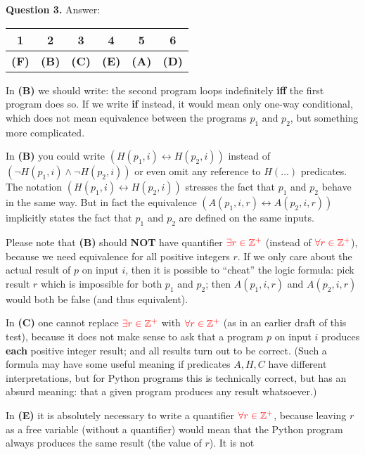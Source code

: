 \documentclass[jou]{apa6}
\begin{document}
\vspace{6pt}
{\bf Question 3.} Answer:\\
\begin{tabular}{|c|c|c|c|c|c|} \hline
1 & 2 & 3 & 4 & 5 & 6 \\ \hline
{\bf (F)} & {\bf (B)} & {\bf (C)} & {\bf (E)} & {\bf (A)} & {\bf (D)} \\ \hline
\end{tabular} 

\vspace{3pt}
In {\bf (B)} we should write: the second program loops indefinitely {\bf iff} 
the first program does so. If we write {\bf if} instead, it 
would mean only one-way conditional, which does not mean 
equivalence between the programs $p_1$ and $p_2$, but something more complicated.

In {\bf (B)} you could write $(H(p_1,i) \leftrightarrow H(p_2,i))$
instead of $(\neg H(p_1,i) \wedge \neg H(p_2,i))$ or 
even omit any reference to $H(\ldots)$ predicates. 
The notation $(H(p_1,i) \leftrightarrow H(p_2,i))$ stresses the fact that $p_1$ and $p_2$ behave in the same way. 
But in fact the equivalence $(A(p_1,i,r) \leftrightarrow A(p_2,i,r))$ implicitly 
states the fact that $p_1$ and $p_2$ are defined on the same inputs.

Please note that {\bf (B)} should {\bf NOT} have quantifier  
 $\textcolor{red}{\exists r \in \mathbb{Z}^{+}}$ 
(instead of  $\textcolor{red}{\forall r \in \mathbb{Z}^{+}}$), because we need
equivalence for all positive integers $r$. If we only care about the
actual result of $p$ on input $i$, then it is possible to ``cheat'' the logic formula: 
pick result $r$ which is impossible for both $p_1$ and $p_2$; then $A(p_1,i,r)$ 
and $A(p_2,i,r)$ would both be false (and thus equivalent).

In {\bf (C)} one cannot replace $\textcolor{red}{\exists r \in \mathbb{Z}^{+}}$
with $\textcolor{red}{\forall r \in \mathbb{Z}^{+}}$ (as in an earlier draft of this test), 
because it does not make sense to ask that a program $p$ on input $i$ produces
{\bf each} positive integer result; and all results turn out to be correct. 
(Such a formula may have some useful meaning if predicates $A,H,C$ have different
interpretations, but for Python programs this is technically correct, but 
has an absurd meaning: that a given program produces any result whatsoever.)

In {\bf (E)} it is absolutely necessary to write a quantifier 
$\textcolor{red}{\forall r \in \mathbb{Z}^{+}}$, because 
leaving $r$ as a free variable (without a quantifier) would 
mean that the Python program always produces the same result
(the value of $r$). It is not 
\end{document}
